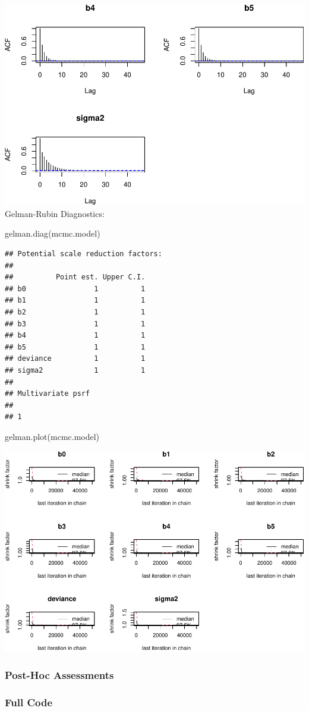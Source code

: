 \documentclass[
]{article}
\newenvironment{Shaded}{\begin{snugshade}}{\end{snugshade}}
\newcommand{\FunctionTok}[1]{\textcolor[rgb]{0.00,0.00,0.00}{#1}}
\newcommand{\NormalTok}[1]{#1}
\begin{document}
\includegraphics{final_report_files/figure-latex/acf-2.pdf} Gelman-Rubin
Diagnostics:

\begin{Shaded}
\begin{Highlighting}[]
\FunctionTok{gelman.diag}\NormalTok{(mcmc.model)}
\end{Highlighting}
\end{Shaded}

\begin{verbatim}
## Potential scale reduction factors:
## 
##          Point est. Upper C.I.
## b0                1          1
## b1                1          1
## b2                1          1
## b3                1          1
## b4                1          1
## b5                1          1
## deviance          1          1
## sigma2            1          1
## 
## Multivariate psrf
## 
## 1
\end{verbatim}

\begin{Shaded}
\begin{Highlighting}[]
\FunctionTok{gelman.plot}\NormalTok{(mcmc.model)}
\end{Highlighting}
\end{Shaded}

\includegraphics{final_report_files/figure-latex/grd-1.pdf}

\hypertarget{post-hoc-assessments}{%
\subsubsection{Post-Hoc Assessments}\label{post-hoc-assessments}}

\hypertarget{full-code}{%
\subsubsection{Full Code}\label{full-code}}
\end{document}
